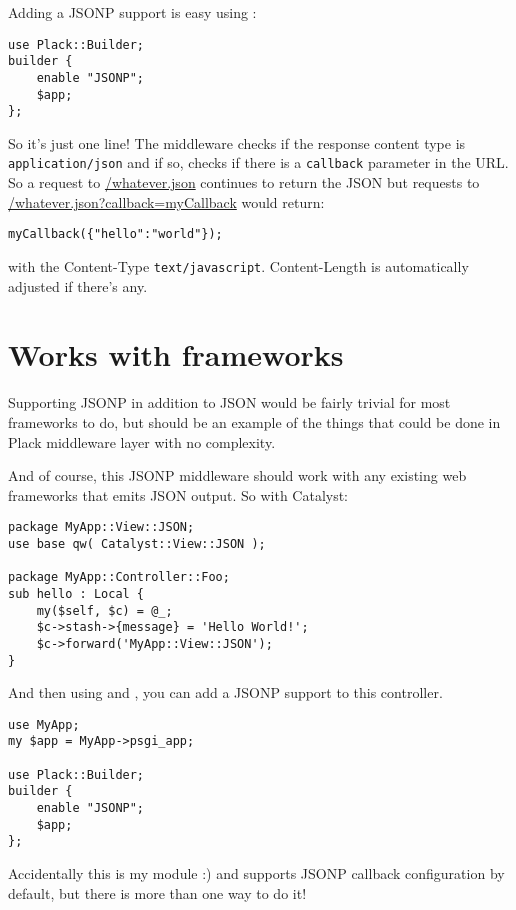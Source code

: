 Adding a JSONP support is easy using :

\begin{lstlisting}
use Plack::Builder;
builder {
    enable "JSONP";
    $app;
};
\end{lstlisting}

So it's just one line! The middleware checks if the response content
type is \lstinline!application/json! and if so, checks if there is a
\lstinline!callback! parameter in the URL. So a request to
\url{/whatever.json} continues to return the JSON but requests to
\url{/whatever.json?callback=myCallback} would return:

\begin{lstlisting}
myCallback({"hello":"world"});
\end{lstlisting}
%
with the Content-Type \lstinline!text/javascript!. Content-Length is
automatically adjusted if there's any.

\section{Works with frameworks}\label{works-with-frameworks}

Supporting JSONP in addition to JSON would be fairly trivial for most
frameworks to do, but  should be an example of the
things that could be done in Plack middleware layer with no complexity.

And of course, this JSONP middleware should work with any existing web
frameworks that emits JSON output. So with Catalyst:

\begin{lstlisting}
package MyApp::View::JSON;
use base qw( Catalyst::View::JSON );

package MyApp::Controller::Foo;
sub hello : Local {
    my($self, $c) = @_;
    $c->stash->{message} = 'Hello World!';
    $c->forward('MyApp::View::JSON');
}
\end{lstlisting}

And then using  and , you can add a
JSONP support to this controller.

\begin{lstlisting}
use MyApp;
my $app = MyApp->psgi_app;

use Plack::Builder;
builder {
    enable "JSONP";
    $app;
};
\end{lstlisting}

Accidentally this
\href{http://search.cpan.org/perldoc?Catalyst::View::JSON}{}
is my module :) and supports JSONP callback configuration by default,
but there is more than one way to do it!

